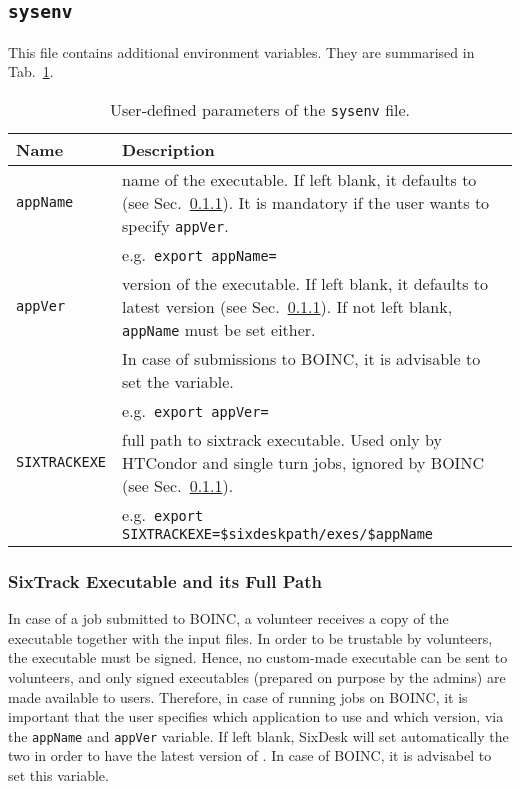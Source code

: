 \subsection{\texttt{sysenv}}\label{Sec:InputFiles:sysenv}
This file contains additional environment variables.
They are summarised in Tab.~\ref{tab:sysenv}.
\begin{table}[h]
\begin{center}
    \caption{User-defined parameters of the \texttt{sysenv} file.}
    \label{tab:sysenv}
    \begin{tabular}{|p{3cm}|p{12cm}|}
    \hline
    \rowcolor{blue!30}
    \textbf{Name} & \textbf{Description} \\
    \hline
    \texttt{appName} & name of the executable.
    If left blank, it defaults to \texttt{\whichSixTrackVersion{}} (see Sec.~\ref{Sec:SixTrackExes}).
    It is mandatory if the user wants to specify \texttt{appVer}. \\
    & e.g.~\texttt{export appName=\whichSixTrack{}} \\
    \hline
    \texttt{appVer} & version of the executable.
    If left blank, it defaults to latest version (see Sec.~\ref{Sec:SixTrackExes}).
    If not left blank, \texttt{appName} must be set either. \\
    & In case of submissions to BOINC, it is advisable to set the variable. \\
    & e.g.~\texttt{export appVer=\whichSixTrackVersion{}} \\
    \hline
    \texttt{SIXTRACKEXE} & full path to sixtrack executable.
    Used only by HTCondor and single turn jobs, ignored by BOINC
    (see Sec.~\ref{Sec:SixTrackExes}). \\
    & e.g.~\texttt{export SIXTRACKEXE=\$sixdeskpath/exes/\$appName} \\
    \hline
    \end{tabular}
\end{center}
\end{table}

\subsubsection{SixTrack Executable and its Full Path}\label{Sec:SixTrackExes}
In case of a job submitted to BOINC, a volunteer receives
a copy of the executable together with the input files. In order to
be trustable by volunteers, the executable must be signed.
Hence, no custom-made executable can be sent to volunteers, and
only signed executables (prepared on purpose by the admins)
are made available to users.
Therefore, in case of running jobs on BOINC, it is important
that the user specifies which application to use and which version,
via the \texttt{appName} and \texttt{appVer} variable. If left
blank, SixDesk will set automatically the two in order to have
the latest version of \whichSixTrack{}.
In case of BOINC, it is advisabel to set this variable.

